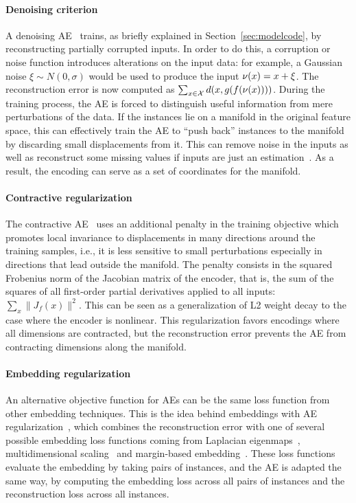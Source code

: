 \paragraph{Denoising criterion} A denoising AE~ trains, as briefly explained in Section~\ref{sec:modelcode}, by reconstructing partially corrupted inputs. In order to do this, a corruption or noise function introduces alterations on the input data: for example, a Gaussian noise $\xi\sim N(0,\sigma)$ would be used to produce the input $\nu(x) = x + \xi$. The reconstruction error is now computed as $\sum_{x\in\mathcal X} d(x, g(f(\nu(x))))$. During the training process, the AE is forced to distinguish useful information from mere perturbations of the data. If the instances lie on a manifold in the original feature space, this can effectively train the AE to ``push back'' instances to the manifold by discarding small displacements from it. This can remove noise in the inputs as well as reconstruct some missing values if inputs are just an estimation~. As a result, the encoding can serve as a set of coordinates for the manifold.

\paragraph{Contractive regularization} The contractive AE~ uses an additional penalty in the training objective which promotes local invariance to displacements in many directions around the training samples, i.e., it is less sensitive to small perturbations especially in directions that lead outside the manifold. The penalty consists in the squared Frobenius norm of the Jacobian matrix of the encoder, that is, the sum of the squares of all first-order partial derivatives applied to all inputs: $\sum_x\lVert J_f(x)\rVert^2$. This can be seen as a generalization of L2 weight decay to the case where the encoder is nonlinear. This regularization favors encodings where all dimensions are contracted, but the reconstruction error prevents the AE from contracting dimensions along the manifold.

\paragraph{Embedding regularization} An alternative objective function for AEs can be the same loss function from other embedding techniques. This is the idea behind embeddings with AE regularization~, which combines the reconstruction error with one of several possible embedding loss functions coming from Laplacian eigenmaps~, multidimensional scaling~ and margin-based embedding~. These loss functions evaluate the embedding by taking pairs of instances, and the AE is adapted the same way, by computing the embedding loss across all pairs of instances and the reconstruction loss across all instances. \\

